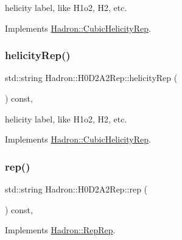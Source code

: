 helicity label, like H1o2, H2, etc. 

Implements \mbox{\hyperlink{structHadron_1_1CubicHelicityRep_af1096946b7470edf0a55451cc662f231}{Hadron\+::\+Cubic\+Helicity\+Rep}}.

\mbox{\label{structHadron_1_1H0D2A2Rep_aa9316edf57dc396c9ff64b842985aa33}} 
\subsubsection{\texorpdfstring{helicityRep()}{helicityRep()}\hspace{0.1cm}{\footnotesize\ttfamily [2/2]}}
{\footnotesize\ttfamily std\+::string Hadron\+::\+H0\+D2\+A2\+Rep\+::helicity\+Rep (\begin{DoxyParamCaption}{ }\end{DoxyParamCaption}) const\hspace{0.3cm}{\ttfamily [inline]}, {\ttfamily [virtual]}}

helicity label, like H1o2, H2, etc. 

Implements \mbox{\hyperlink{structHadron_1_1CubicHelicityRep_af1096946b7470edf0a55451cc662f231}{Hadron\+::\+Cubic\+Helicity\+Rep}}.

\mbox{\label{structHadron_1_1H0D2A2Rep_ae0f8b84aedb60c30e04ff9aa344142a6}} 
\subsubsection{\texorpdfstring{rep()}{rep()}\hspace{0.1cm}{\footnotesize\ttfamily [1/3]}}
{\footnotesize\ttfamily std\+::string Hadron\+::\+H0\+D2\+A2\+Rep\+::rep (\begin{DoxyParamCaption}{ }\end{DoxyParamCaption}) const\hspace{0.3cm}{\ttfamily [inline]}, {\ttfamily [virtual]}}



Implements \mbox{\hyperlink{structHadron_1_1RepRep_ab3213025f6de249f7095892109575fde}{Hadron\+::\+Rep\+Rep}}.

\mbox{\label{structHadron_1_1H0D2A2Rep_ae0f8b84aedb60c30e04ff9aa344142a6}} 
